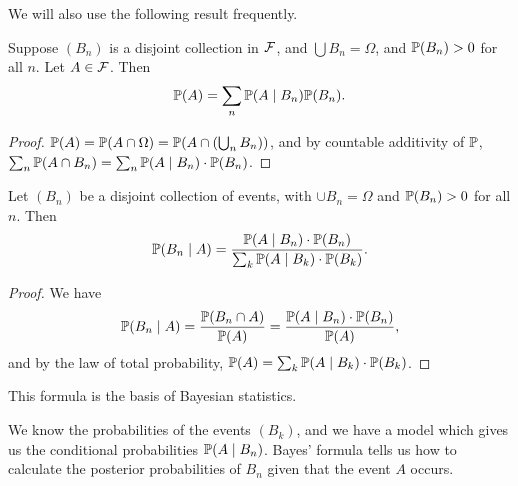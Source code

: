 \documentclass[a4paper]{scrreprt}
\begin{document}
We will also use the following result frequently.

\begin{proposition}
	Suppose $(B_n)$ is a disjoint collection in $\mathcal{F}$, and $\bigcup B_n = \Omega$, and $\mathbb{P}(B_n) > 0$ for all $n$. Let $A \in \mathcal{F}$. Then 
	$$
	\mathbb{P}(A) = \sum_n \mathbb{P}(A \mid B_n) \mathbb{P}(B_n).
	$$
\end{proposition}
\begin{proof}
	$\mathbb{P}(A) = \mathbb{P}(A \cap \Omega) = \mathbb{P}(A \cap (\bigcup_n B_n))$, and by countable additivity of $\mathbb{P}$, $\sum_{n}\mathbb{P}(A \cap B_n) = \sum_n \mathbb{P}(A\mid B_n) \cdot \mathbb{P}(B_n)$.
\end{proof}

\begin{proposition}
	Let $(B_n)$ be a disjoint collection of events, with $\cup B_n = \Omega$ and $\mathbb{P}(B_n) > 0$ for all $n$. Then
	$$
	\mathbb{P}(B_n \mid A) = \frac{\mathbb{P}(A \mid B_n) \cdot \mathbb{P}(B_n)}{\sum_k \mathbb{P}(A\mid B_k) \cdot\mathbb{P}(B_k)}. 
	$$
\end{proposition}
\begin{proof}
	We have
	$$
	\mathbb{P}(B_n \mid A) = \frac{\mathbb{P}(B_n \cap A)}{\mathbb{P}(A)} = \frac{\mathbb{P}(A\mid B_n) \cdot \mathbb{P}(B_n)}{\mathbb{P}(A)},
	$$
	and by the law of total probability, $\mathbb{P}(A) = \sum_k \mathbb{P}(A \mid B_k) \cdot \mathbb{P}(B_k)$.
\end{proof}

This formula is the basis of Bayesian statistics.

We know the probabilities of the events $(B_k)$, and we have a model which gives us the conditional probabilities $\mathbb{P}(A \mid B_n)$. Bayes' formula tells us how to calculate the posterior probabilities of $B_n$ given that the event $A$ occurs.
\end{document}
